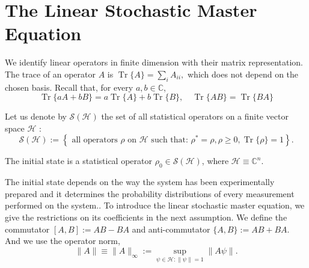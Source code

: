 \section{The Linear Stochastic Master Equation}

We identify linear operators in finite dimension with their matrix representation. The trace of an operator $A$ is $\operatorname{Tr}\{A\}=\sum_{i} A_{i i},$ which does not depend on the chosen basis. Recall that, for every $a, b \in \mathbb{C}$, \[ \operatorname{Tr}\{a A+b B\}=a \operatorname{Tr}\{A\}+b \operatorname{Tr}\{B\}, \quad \operatorname{Tr}\{A B\}=\operatorname{Tr}\{B A\} \]

Let us denote by $\mathcal{S}(\mathcal{H})$ the set of all statistical operators on a finite vector space $\mathcal{H}$ :
\[ \mathcal{S}(\mathcal{H}):=\left\{\text { all operators } \rho \text { on } \mathcal{H} \text { such that: } \rho^{*}=\rho, \rho \geq 0, \operatorname{Tr}\{\rho\}=1\right\}. \]

\begin{assumption}\label{assump:state}
	The initial state is a statistical operator $\rho_{0} \in \mathcal{S}(\mathcal{H})$, where $\mathcal{H} \equiv \mathbb{C}^{n}$.
\end{assumption}
The initial state depends on the way the system has been experimentally prepared and it determines the probability distributions of every measurement performed on the system.. To introduce the linear stochastic master equation, we give the restrictions on its coefficients in the next assumption. We define the commutator $ [A,B] := AB - BA $ and anti-commutator
$ \{A, B\} := AB + BA$. And we use the operator norm,
\begin{equation}\label{def:operator_norm}
	\|A\| \equiv\|A\|_{\infty}:=\sup _{\psi \in \mathcal{H}:\|\psi\|=1}\|A \psi\|.
\end{equation}

